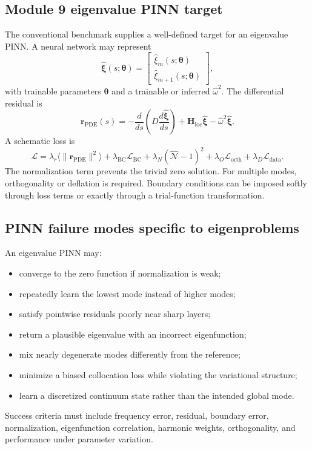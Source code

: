 \subsection{Module 9 eigenvalue PINN target}
The conventional benchmark supplies a well-defined target for an eigenvalue PINN. A neural network may represent
\begin{equation}
\widehat{\boldsymbol\xi}(s;\boldsymbol\theta)
=\begin{bmatrix}
\widehat\xi_m(s;\boldsymbol\theta)\\
\widehat\xi_{m+1}(s;\boldsymbol\theta)
\end{bmatrix},
\end{equation}
with trainable parameters $\boldsymbol\theta$ and a trainable or inferred $\widehat\omega^2$. The differential residual is
\begin{equation}
\mathbf r_{\mathrm{PDE}}(s)=
-\frac{d}{ds}\left(D\frac{d\widehat{\boldsymbol\xi}}{ds}\right)
+\mathbf H_{\mathrm{loc}}\widehat{\boldsymbol\xi}
-\widehat\omega^2\widehat{\boldsymbol\xi}.
\end{equation}
A schematic loss is
\begin{equation}
\mathcal L=
\lambda_r\langle\|\mathbf r_{\mathrm{PDE}}\|^2\rangle
+\lambda_{\mathrm{BC}}\mathcal L_{\mathrm{BC}}
+\lambda_N\left(\widehat{\mathcal N}-1\right)^2
+\lambda_O\mathcal L_{\mathrm{orth}}
+\lambda_D\mathcal L_{\mathrm{data}}.
\label{eq:eigen_pinn_loss}
\end{equation}
The normalization term prevents the trivial zero solution. For multiple modes, orthogonality or deflation is required. Boundary conditions can be imposed softly through loss terms or exactly through a trial-function transformation.

\subsection{PINN failure modes specific to eigenproblems}
An eigenvalue PINN may:
\begin{itemize}[leftmargin=1.6em]
\item converge to the zero function if normalization is weak;
\item repeatedly learn the lowest mode instead of higher modes;
\item satisfy pointwise residuals poorly near sharp layers;
\item return a plausible eigenvalue with an incorrect eigenfunction;
\item mix nearly degenerate modes differently from the reference;
\item minimize a biased collocation loss while violating the variational structure;
\item learn a discretized continuum state rather than the intended global mode.
\end{itemize}
Success criteria must include frequency error, residual, boundary error, normalization, eigenfunction correlation, harmonic weights, orthogonality, and performance under parameter variation.

